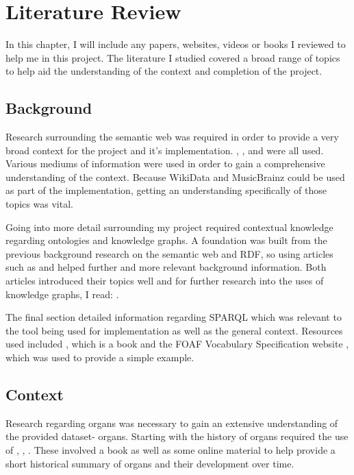 \chapter{Literature Review}
In this chapter, I will include any papers, websites, videos or books I reviewed to help me in this project. The literature I studied covered a broad range of topics to help aid the understanding of the context and completion of the project.

\section{Background}
\hspace{0.5cm} Research surrounding the semantic web was required in order to provide a very broad context for the project and it's implementation. \cite{berners-TBLBook}, \cite{semanticweb}, \cite{rdf} and \cite{TTL} were all used. Various mediums of information were used in order to gain a comprehensive understanding of the context. Because WikiData \cite{wikidata} and MusicBrainz \cite{musicbrainz} could be used as part of the implementation, getting an understanding specifically of those topics was vital. 

Going into more detail surrounding my project required contextual knowledge regarding ontologies and knowledge graphs. A foundation was built from the previous background research on the semantic web and RDF, so using articles such as \cite{ontology} and \cite{knowledgegraph} helped further and more relevant background information. Both articles introduced their topics well and for further research into the uses of knowledge graphs, I read: \cite{searchengine}.   

The final section detailed information regarding SPARQL which was relevant to the tool being used for implementation as well as the general context. Resources used included \cite{sparlbook}, which is a book and the FOAF Vocabulary Specification website \cite{foaf}, which was used to provide a simple example. 

\section{Context}
\hspace{0.5cm} Research regarding organs was necessary to gain an extensive understanding of the provided dataset- organs. Starting with the history of organs required the use of \cite{organhistory}, \cite{organhistory1}, \cite{organmedivalhistory}. These involved a book as well as some online material to help provide a short historical summary of organs and their development over time. 

